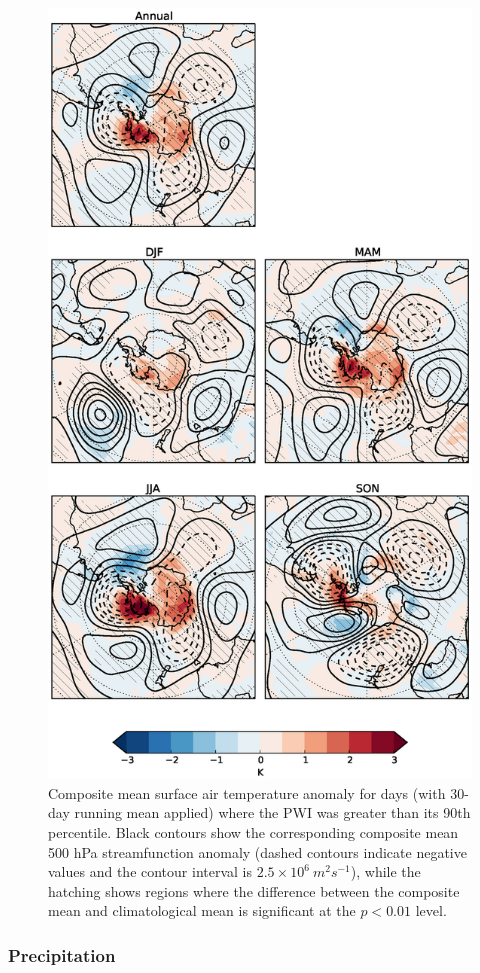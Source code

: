 \begin{figure}
\begin{center}
\includegraphics[width=0.63\columnwidth]{figures/zonalwaves/tas-composite_pwigt90pct_ERAInterim_500hPa_030day-runmean-anom-wrt-all_native-shextropics15.eps}
\caption{\label{fig:tas_composite}
Composite mean surface air temperature anomaly for days (with 30-day running mean applied) where the PWI was greater than its 90th percentile. Black contours show the corresponding composite mean 500 hPa streamfunction anomaly (dashed contours indicate negative values and the contour interval is $2.5 \times 10^6 \: m^2 s^{-1}$), while the hatching shows regions where the difference between the composite mean and climatological mean is significant at the $p < 0.01$ level.}
\end{center}
\end{figure}

    
\subsubsection{Precipitation}

